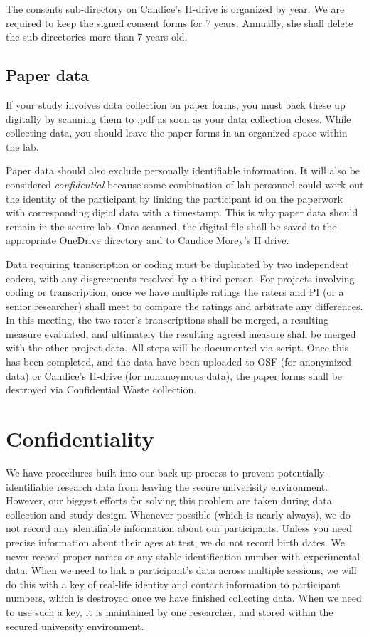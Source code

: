 \documentclass[12pt,]{book}
\theoremstyle{definition}
\theoremstyle{definition}
\theoremstyle{definition}
\theoremstyle{remark}
\begin{document}
The consents sub-directory on Candice's H-drive is organized by year. We
are required to keep the signed consent forms for 7 years. Annually, she
shall delete the sub-directories more than 7 years old.

\subsection{Paper data}\label{paper-data}

If your study involves data collection on paper forms, you must back
these up digitally by scanning them to .pdf as soon as your data
collection closes. While collecting data, you should leave the paper
forms in an organized space within the lab.

Paper data should also exclude personally identifiable information. It
will also be considered \emph{confidential} because some combination of
lab personnel could work out the identity of the participant by linking
the participant id on the paperwork with corresponding digial data with
a timestamp. This is why paper data should remain in the secure lab.
Once scanned, the digital file shall be saved to the appropriate
OneDrive directory and to Candice Morey's H drive.

Data requiring transcription or coding must be duplicated by two
independent coders, with any disgreements resolved by a third person.
For projects involving coding or transcription, once we have multiple
ratings the raters and PI (or a senior researcher) shall meet to compare
the ratings and arbitrate any differences. In this meeting, the two
rater's transcriptions shall be merged, a resulting measure evaluated,
and ultimately the resulting agreed measure shall be merged with the
other project data. All steps will be documented via script. Once this
has been completed, and the data have been uploaded to OSF (for
anonymized data) or Candice's H-drive (for nonanoymous data), the paper
forms shall be destroyed via Confidential Waste collection.

\section{Confidentiality}\label{confidentiality}

We have procedures built into our back-up process to prevent
potentially-identifiable research data from leaving the secure
univerisity environment. However, our biggest efforts for solving this
problem are taken during data collection and study design. Whenever
possible (which is nearly always), we do not record any identifiable
information about our participants. Unless you need precise information
about their ages at test, we do not record birth dates. We never record
proper names or any stable identification number with experimental data.
When we need to link a participant's data across multiple sessions, we
will do this with a key of real-life identity and contact information to
participant numbers, which is destroyed once we have finished collecting
data. When we need to use such a key, it is maintained by one
researcher, and stored within the secured university environment.
\end{document}
